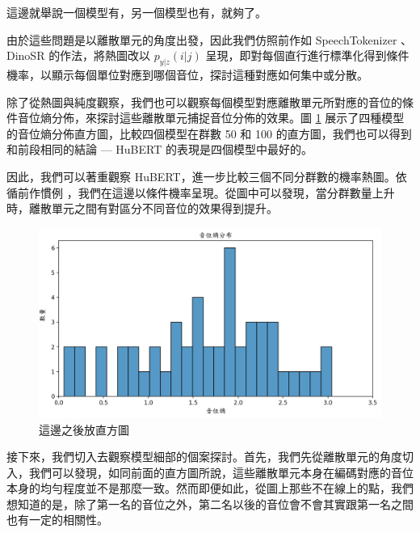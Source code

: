 {{

        這邊就舉說一個模型有，另一個模型也有，就夠了。
}

        由於這些問題是以離散單元的角度出發，因此我們仿照前作如 SpeechTokenizer \cite{zhang2024speechtokenizer}、DinoSR \cite{liu2024dinosr} 的作法，將熱圖改以 $p_{y|z}(i|j)$ 呈現，即對每個直行進行標準化得到條件機率，以顯示每個單位對應到哪個音位，探討這種對應如何集中或分散。


        除了從熱圖與純度觀察，我們也可以觀察每個模型對應離散單元所對應的音位的條件音位熵分佈，來探討這些離散單元捕捉音位分佈的效果。圖 \ref{fig:zhifangtu} 展示了四種模型的音位熵分佈直方圖，比較四個模型在群數 50 和 100 的直方圖，我們也可以得到和前段相同的結論 --- HuBERT 的表現是四個模型中最好的。

        因此，我們可以著重觀察 HuBERT，進一步比較三個不同分群數的機率熱圖。依循前作慣例 \cite{wells_phonetic_2022, zhang2024speechtokenizer, liu2024dinosr} ，我們在這邊以條件機率呈現。從圖中可以發現，當分群數量上升時，離散單元之間有對區分不同音位的效果得到提升。


{
\begin{figure}
    \centering
    \includegraphics[width=0.5\linewidth]{figures/0000000.png}
    \caption{這邊之後放直方圖}
    \label{fig:zhifangtu}
\end{figure}

  }
  

        接下來，我們切入去觀察模型細部的個案探討。首先，我們先從離散單元的角度切入，我們可以發現，如同前面的直方圖所說，這些離散單元本身在編碼對應的音位本身的均勻程度並不是那麼一致。然而即便如此，從圖上那些不在線上的點，我們想知道的是，除了第一名的音位之外，第二名以後的音位會不會其實跟第一名之間也有一定的相關性。

}

